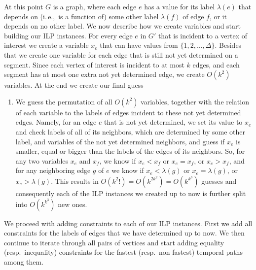 \documentclass[11pt,a4paper]{article}
\theoremstyle{remark}
\theoremstyle{definition}
\newcommand{\ie}{i.\,e.,\ }
\newcounter{guesscounter}
\begin{document}
At this point $G$ is a graph, where each edge $e$ has a value for its label $\lambda(e)$
that depends on (\ie is a function of) some other label $\lambda(f)$ of edge $f$,
or it depends on no other label.
We now describe how we create variables and start building our ILP instances. 
For every edge $e$ in $G'$ that is incident to a vertex of interest we create a variable $x_e$ that can have values from $ \{1, 2, \dots, \Delta\}$.
Besides that we create one variable for each edge that is still not yet determined on a segment.
Since each vertex of interest is incident to at most $k$ edges, and each segment has at most one extra not yet determined edge, we create $O(k^2)$ variables.
At the end we create our final guess
\begin{enumerate}[G-1.]
\setcounter{enumi}{\value{guesscounter}}
    \item \label{FPT:guessallPermutations}
We guess the permutation of all $O(k^2)$ variables,
together with the relation of each variable to the labels of edges incident to these not yet determined edges.
Namely, for an edge $e$ that is not yet determined, we set its value to $x_e$ and check labels of all of its neighbors,
which are determined by some other label,
and variables of the not yet determined neighbors,
and guess if $x_e$ is smaller, equal or bigger than the labels of the edges of its neighbors.
So, for any two variables $x_e$ and $x_f$, we know if $x_e < x_f$ or $x_e = x_f$, or $x_e > x_f$,
and for any neighboring edge $g$ of $e$ we know if $x_e < \lambda(g)$ or 
$x_e = \lambda(g)$, or $x_e > \lambda(g)$.
This results in $O(k^2 !) = O(k^{2k^2}) = O(k^{k^3})$ guesses
and consequently
each of the ILP instances we created up to now is further split into $O(k^{k^3})$ new ones.
\end{enumerate}

We proceed with adding constraints to each of our ILP instances.
First we add all constraints for the labels of edges that we have determined up to now.
We then continue to iterate through all pairs of vertices and start adding equality (resp.~inequality) constraints for the fastest (resp.~non-fastest) temporal paths among them.
\end{document}
